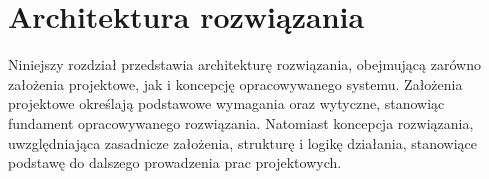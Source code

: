 \chapter{Architektura rozwiązania}

Niniejszy rozdział przedstawia architekturę rozwiązania, obejmującą zarówno założenia projektowe, jak i koncepcję opracowywanego systemu. Założenia projektowe określają podstawowe wymagania oraz wytyczne, stanowiąc fundament opracowywanego rozwiązania. Natomiast koncepcja rozwiązania, uwzględniająca zasadnicze założenia, strukturę i logikę działania, stanowiące podstawę do dalszego prowadzenia prac projektowych.












